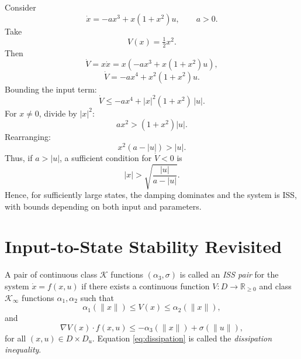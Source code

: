 \begin{example}
Consider
\begin{equation}
    \dot{x} = -a x^3 + x(1+x^2)u, \qquad a>0.
\end{equation}
Take
\begin{equation}
    V(x)=\tfrac{1}{2}x^2.
\end{equation}
Then
\begin{equation}
    \dot V = x\dot x = x(-a x^3 + x(1+x^2)u),
\end{equation}
\begin{equation}
    \dot V = -a x^4 + x^2(1+x^2)u.
\end{equation}
Bounding the input term:
\begin{equation}
    \dot V \le -a x^4 + |x|^2(1+x^2)\,|u|.
\end{equation}
For $x\neq 0$, divide by $|x|^2$:
\begin{equation}
    a x^2 > (1+x^2)|u|.
\end{equation}
Rearranging:
\begin{equation}
    x^2(a-|u|) > |u|.
\end{equation}
Thus, if $a>|u|$, a sufficient condition for $\dot V<0$ is
\begin{equation}
    |x| > \sqrt{\frac{|u|}{a-|u|}}.
\end{equation}
Hence, for sufficiently large states, the damping dominates and the system is ISS, 
with bounds depending on both input and parameters.
\end{example}


\section{Input-to-State Stability Revisited}

\begin{definition}
A pair of continuous class $\mathcal{K}$ functions $(\alpha_3,\sigma)$ is called an 
\emph{ISS pair} for the system $\dot x=f(x,u)$ if there exists a continuous function 
$V:D\to\mathbb{R}_{\ge 0}$ and class $\mathcal{K}_\infty$ functions 
$\alpha_1,\alpha_2$ such that
\begin{equation}
    \alpha_1(\|x\|)\le V(x)\le \alpha_2(\|x\|), \label{eq:Vbounds}
\end{equation}
and
\begin{equation}
    \nabla V(x)\cdot f(x,u) \le -\alpha_3(\|x\|) + \sigma(\|u\|),
    \label{eq:dissipation}
\end{equation}
for all $(x,u)\in D\times D_u$. Equation \eqref{eq:dissipation} is called the 
\emph{dissipation inequality}.
\end{definition}

